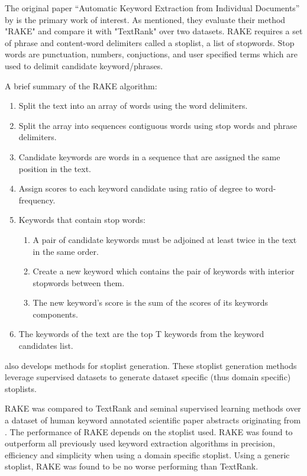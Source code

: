 \documentclass[11pt,a4paper]{article}
\begin{document}
The original paper “Automatic Keyword Extraction from Individual Documents” by \citet{1} is the primary work of interest. As mentioned, they evaluate their method "RAKE" and compare it with "TextRank" over two datasets. RAKE requires a set of phrase and content-word delimiters called a stoplist, a list of stopwords. Stop words are punctuation, numbers, conjuctions, and user specified terms which are used to delimit candidate keyword/phrases. 

A brief summary of the RAKE algorithm:
\begin{enumerate}
\item Split the text into an array of words using the word delimiters.
\item Split the array into sequences contiguous words using stop words and phrase delimiters.
\item Candidate keywords are words in a sequence that are assigned the same position in the text. 
\item Assign scores to each keyword candidate using ratio of degree to word-frequency. 
\item Keywords that contain stop words:
\begin{enumerate}
\item A pair of candidate keywords must be adjoined at least twice in the text in the same order.
\item Create a new keyword which contains the pair of keywords with interior stopwords between them.
\item The new keyword’s score is the sum of the scores of its keywords components.
\end{enumerate}
\item The keywords of the text are the top T keywords from the keyword candidates list.
\end{enumerate}

\citet{1} also develops methods for stoplist generation. These stoplist generation methods leverage supervised datasets to generate dataset specific (thus domain specific) stoplists. 

RAKE was compared to TextRank and seminal supervised learning methods \citep{hulth-2003-improved} over a dataset of human keyword annotated scientific paper abstracts originating from \citet{hulth-2003-improved}. The performance of RAKE depends on the stoplist used. RAKE was found to outperform all previously used keyword extraction algorithms in precision, efficiency and simplicity when using a domain specific stoplist. Using a generic stoplist, RAKE was found to be no worse performing than TextRank.
\end{document}
